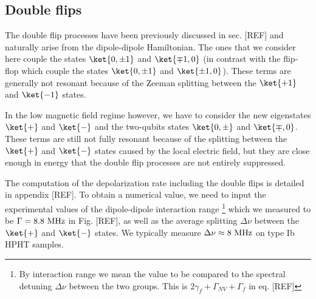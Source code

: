 \documentclass[a4paper, 11pt]{book}
\begin{document}
%
%

\subsection{Double flips}

The double flip processes have been previously discussed in sec. [REF] and naturally arise from the dipole-dipole Hamiltonian. The ones that we consider here couple the states $\ket{0, \pm 1}$ and $\ket{\mp 1, 0}$ (in contrast with the flip-flop which couple the states $\ket{0, \pm 1}$ and $\ket{\pm 1, 0}$). These terms are generally not resonant because of the Zeeman splitting between the $\ket{+1}$ and $\ket{-1}$ states. 

In the low magnetic field regime however, we have to consider the new eigenstates $\ket{+}$ and $\ket{-}$ and the two-qubits states $\ket{0, \pm}$ and $\ket{\mp, 0}$. These terms are still not fully resonant because of the splitting between the $\ket{+}$ and $\ket{-}$ states caused by the local electric field, but they are close enough in energy that the double flip processes are not entirely suppressed.

The computation of the depolarization rate including the double flips is detailed in appendix [REF]. To obtain a numerical value, we need to input the experimental values of the dipole-dipole interaction range \footnote{By interaction range we mean the value to be compared to the spectral detuning $\Delta \nu$ between the two groups. This is $2\gamma_f+\Gamma_{NV}+\Gamma_f$ in eq. [REF]} which we measured to be $\Gamma=8.8\ \rm MHz$ in Fig. [REF], as well as the average splitting $\Delta \nu$ between the $\ket{+}$ and $\ket{-}$ states. We typically measure $\Delta \nu \approx 8\ \rm MHz$ on type Ib HPHT samples.
\end{document}
